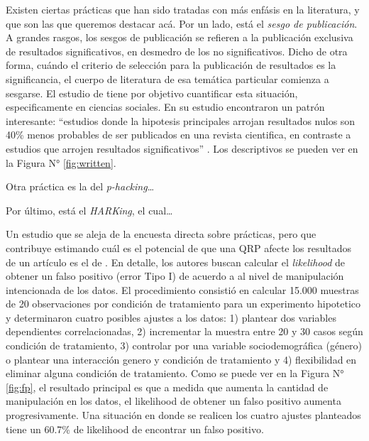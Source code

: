 \documentclass[
]{book}
\begin{document}
Existen ciertas prácticas que han sido tratadas con más enfásis en la literatura, y que son las que queremos destacar acá. Por un lado, está el \emph{sesgo de publicación}. A grandes rasgos, los sesgos de publicación se refieren a la publicación exclusiva de resultados significativos, en desmedro de los no significativos. Dicho de otra forma, cuándo el criterio de selección para la publicación de resultados es la significancia, el cuerpo de literatura de esa temática particular comienza a sesgarse. El estudio de \citet{franco_Publication_2014} tiene por objetivo cuantificar esta situación, especificamente en ciencias sociales. En su estudio encontraron un patrón interesante: ``estudios donde la hipotesis principales arrojan resultados nulos son 40\% menos probables de ser publicados en una revista cientifica, en contraste a estudios que arrojen resultados significativos'' \citep[p.41]{christensen_Transparent_2019}. Los descriptivos se pueden ver en la Figura N° \ref{fig:written}.

Otra práctica es la del \emph{p-hacking}\ldots{}

Por último, está el \emph{HARKing}, el cual\ldots{}

Un estudio que se aleja de la encuesta directa sobre prácticas, pero que contribuye estimando cuál es el potencial de que una QRP afecte los resultados de un artículo es el de \citet{simmons_FalsePositive_2011}. En detalle, los autores buscan calcular el \emph{likelihood} de obtener un falso positivo (error Tipo I) de acuerdo a al nivel de manipulación intencionada de los datos. El procedimiento consistió en calcular 15.000 muestras de 20 observaciones por condición de tratamiento para un experimento hipotetico y determinaron cuatro posibles ajustes a los datos: 1) plantear dos variables dependientes correlacionadas, 2) incrementar la muestra entre 20 y 30 casos según condición de tratamiento, 3) controlar por una variable sociodemográfica (género) o plantear una interacción genero y condición de tratamiento y 4) flexibilidad en eliminar alguna condición de tratamiento. Como se puede ver en la Figura N° \ref{fig:fp}, el resultado principal es que a medida que aumenta la cantidad de manipulación en los datos, el likelihood de obtener un falso positivo aumenta progresivamente. Una situación en donde se realicen los cuatro ajustes planteados tiene un 60.7\% de likelihood de encontrar un falso positivo.
\end{document}
